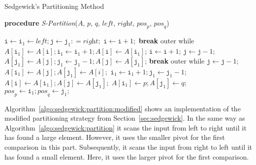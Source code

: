\documentclass[prodmode,acmtalg]{acmsmall}
\begin{document}
\begin{algorithm}
    \caption{Sedgewick's Partitioning Method}\samepage\label{algo:sedgewick:partition}
		\textbf{procedure} \textit{S-Partition}($\textit{A}$,
		$\textit{p}$, $\textit{q}$, $\textit{left}$,
		$\textit{right}$, $\textit{pos}_{\textit{p}}$, $\textit{pos}_{\textit{q}}$)
                \begin{algorithmic}[1]
		  \State $\texttt{i} \gets \texttt{i}_1 \gets \textit{left}; \texttt{j} \gets \texttt{j}_1 : = \textit{right};$
                  \State $\texttt{i} \gets \texttt{i} + 1;$
                  \State \textbf{break} outer while 
                  \EndIf
                  \State $\textit{A}[\texttt{i}_1] \gets \textit{A}[\texttt{i}]; \texttt{i}_1 \gets \texttt{i}_1 + 1; \textit{A}[\texttt{i}] \gets \textit{A}[\texttt{i}_1]$;
                  \EndIf
		  \State $\texttt{i} \gets \texttt{i} + 1$;
		 \EndWhile
		 \State $\texttt{j} \gets \texttt{j} - 1;$
                 \State $\textit{A}[\texttt{j}_1] \gets \textit{A}[\texttt{j}]; \texttt{j}_1 \gets \texttt{j}_1 - 1; \textit{A}[\texttt{j}] \gets \textit{A}[\texttt{j}_1]$; 
                 \EndIf
                 \State \textbf{break} outer while
                 \EndIf
		 \State $\texttt{j} \gets \texttt{j} - 1$;
		 \EndWhile
		 \State $\textit{A}[\texttt{i}_1] \gets \textit{A}[\texttt{j}]; \textit{A}[\texttt{j}_1] \gets \textit{A}[i];$
		 \State $\texttt{i}_1 \gets \texttt{i}_1 + 1; \texttt{j}_1 \gets \texttt{j}_1 - 1;$
		 \State $\textit{A}[\texttt{i}] \gets \textit{A}[\texttt{i}_1]; \textit{A}[\texttt{j}] \gets \textit{A}[\texttt{j}_1];$
		 \EndWhile
		 \State $\textit{A}[\texttt{i}_1] \gets \textit{p}; \textit{A}[\texttt{j}_1] \gets \textit{q};$
		 \State $\textit{pos}_{\textit{p}} \gets \texttt{i}_1;  \textit{pos}_{\textit{q}} \gets \texttt{j}_1;$
            \end{algorithmic}
        \end{algorithm}
Algorithm~\ref{algo:sedgewick:partition:modified} shows an implementation of the
modified partitioning strategy from Section~\ref{sec:sedgewick}. In the same way
as Algorithm~\ref{algo:sedgewick:partition} it scans the input from left to
right
until it has found a large element. However, it uses the smaller pivot for the
first comparison in this part. Subsequently, it scans the input from right
to left until it has found a small element. Here, it uses the larger pivot for
the first comparison. 
\end{document}

